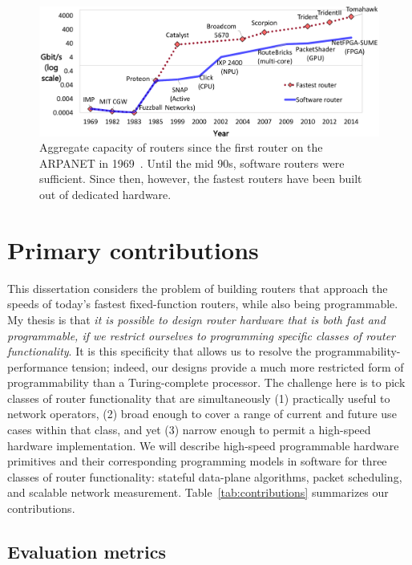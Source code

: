 \begin{figure}
\centering
\includegraphics[width=\columnwidth]{router_evolution.pdf}
\caption{Aggregate capacity of routers since the first router on the ARPANET in
1969~\cite{imp}. Until the mid 90s, software routers were sufficient. Since
then, however, the fastest routers have been built out of dedicated hardware.}
\label{fig:router_evolution}
\end{figure}

\section{Primary contributions}


This dissertation considers the problem of building routers that approach the
speeds of today's fastest fixed-function routers, while also being
programmable. My thesis is that {\em it is possible to design router hardware
that is both fast and programmable, if we restrict ourselves to programming
specific classes of router functionality}. It is this specificity that allows
us to resolve the programmability-performance tension; indeed, our designs
provide a much more restricted form of programmability than a Turing-complete
processor.  The challenge here is to pick classes of router functionality that
are simultaneously (1) practically useful to network operators, (2) broad
enough to cover a range of current and future use cases within that class, and
yet (3) narrow enough to permit a high-speed hardware implementation. We will
describe high-speed programmable hardware primitives and their corresponding
programming models in software for three classes of router functionality:
stateful data-plane algorithms, packet scheduling, and scalable network
measurement.  Table~\ref{tab:contributions} summarizes our contributions.

\subsection{Evaluation metrics}
\label{ss:eval_metrics}

